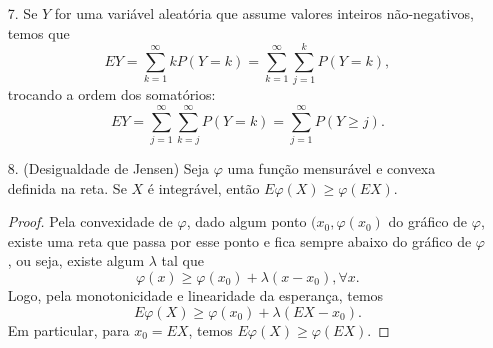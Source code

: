 %
\begin{frame}
%
\begin{itemize}
%
%
\item[7.] Se $Y$ for uma variável aleatória que assume
valores inteiros não-negativos, temos que
$$EY=\sum_{k=1}^{\infty}kP(Y=k)=\sum_{k=1}^{\infty}\sum_{j=1}^{k}P(Y=k),$$
trocando a ordem dos somatórios:
\begin{equation}
EY=\sum_{j=1}^{\infty}\sum_{k=j}^{\infty}P(Y=k)=\sum_{j=1}^{\infty}P(Y\geq
j).\nonumber\end{equation}
%
%
%
%
%
%
\item[8.] (Desigualdade de Jensen) Seja $\varphi$ uma função mensurável e convexa definida na reta. Se $X$ é integrável, então $E\varphi(X)\geq \varphi(EX)$.

\begin{proof}
Pela convexidade de $\varphi$, dado algum ponto $(x_0,\varphi(x_0)$ do gráfico de $\varphi$, existe uma reta que passa por esse ponto e fica sempre abaixo do gráfico de $\varphi$, ou seja, existe algum $\lambda$ tal que
$$\varphi(x)\geq \varphi(x_0)+\lambda(x-x_0),\forall x.$$
Logo, pela monotonicidade e linearidade da esperança, temos
$$E\varphi(X)\geq \varphi(x_0)+\lambda(EX-x_0).$$
Em particular, para $x_0=EX$, temos $E\varphi(X)\geq \varphi(EX)$.
\end{proof}

\end{itemize}

\end{frame}
%
